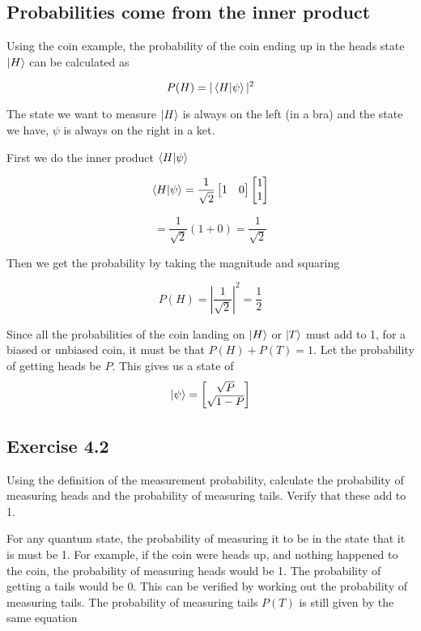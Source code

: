 \documentclass{book}
\begin{document}
\subsection{ Probabilities come from the inner product}

Using the coin example, the probability of the coin ending up in the heads state $\ket{H}$ can be calculated as

$$ P(H) = |\braket{H|\psi}|^2  $$

The state we want to measure $\ket{H}$ is always on the left (in a bra) and the state we have, $\psi$ is always on the right in a ket.

First we do the inner product $\braket{H|\psi}$

$$
\braket{H|\psi} = \frac{1}{\sqrt{2}}\begin{bmatrix} 1 & 0 \end{bmatrix} \begin{bmatrix} 1 \\ 1 \end{bmatrix}
$$

$$ = \frac{1}{\sqrt{2}} (1 + 0 ) = \frac{1}{\sqrt{2}}$$

Then we get the probability by taking the magnitude and squaring 

$$ P(H) = \left| \frac{1}{\sqrt{2}} \right|^2 = \frac{1}{2} $$

Since all the probabilities of the coin landing on $\ket{H}$ or $\ket{T}$ must add to 1, for a biased or unbiased coin, it must be that $P(H) + P(T) = 1$. Let the probability of getting heads be $P$. This gives us a state of 
$$
\ket{\psi} = \begin{bmatrix} \sqrt{P} \\ \sqrt{1-P} \end{bmatrix}
$$

\hline

\subsection{Exercise 4.2}

Using the definition of the measurement probability, calculate the probability of measuring heads and the probability of measuring tails. Verify that these add to 1. \newline

\hline  
\hspace{10}

For any quantum state, the probability of measuring it to be in the state that it is must be 1. For example, if the coin were heads up, and nothing happened to the coin, the probability of measuring heads would be 1. The probability of getting a tails would be 0. This can be verified by working out the probability of measuring tails. The probability of measuring tails $P(T)$ is still given by the same equation 
\end{document}
